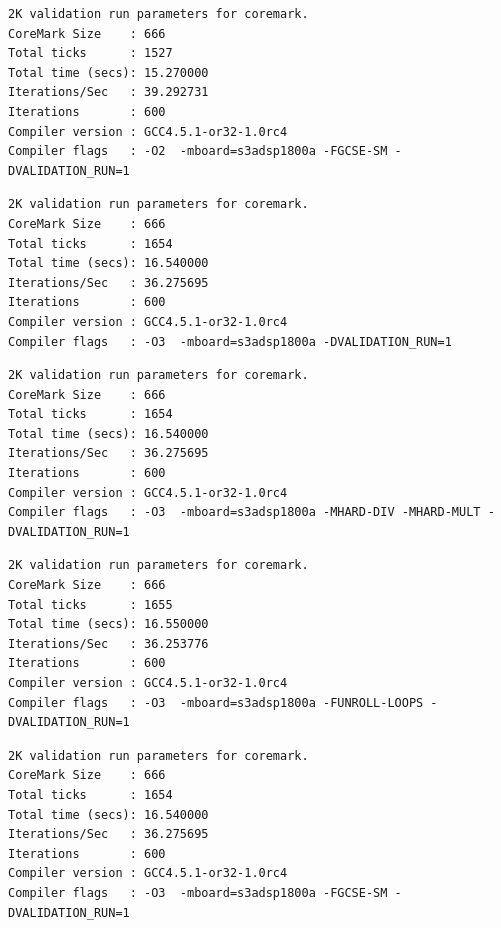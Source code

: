 \begin{lstlisting}[frame=single,caption={Optimización nivel -O2 - Flags activos : -FGCSE-SM},label={lst:salidas},breaklines]
2K validation run parameters for coremark.
CoreMark Size    : 666
Total ticks      : 1527
Total time (secs): 15.270000
Iterations/Sec   : 39.292731
Iterations       : 600
Compiler version : GCC4.5.1-or32-1.0rc4
Compiler flags   : -O2  -mboard=s3adsp1800a -FGCSE-SM -DVALIDATION_RUN=1  
\end{lstlisting}

\begin{lstlisting}[frame=single,caption={Optimización nivel -O3 - Sin Flags activos},label={lst:salidas},breaklines]
2K validation run parameters for coremark.
CoreMark Size    : 666
Total ticks      : 1654
Total time (secs): 16.540000
Iterations/Sec   : 36.275695
Iterations       : 600
Compiler version : GCC4.5.1-or32-1.0rc4
Compiler flags   : -O3  -mboard=s3adsp1800a -DVALIDATION_RUN=1  
\end{lstlisting}

\begin{lstlisting}[frame=single,caption={Optimización nivel -O3 - Flags activos -MHARD-DIV -MHARD-MULT},label={lst:salidas},breaklines]
2K validation run parameters for coremark.
CoreMark Size    : 666
Total ticks      : 1654
Total time (secs): 16.540000
Iterations/Sec   : 36.275695
Iterations       : 600
Compiler version : GCC4.5.1-or32-1.0rc4
Compiler flags   : -O3  -mboard=s3adsp1800a -MHARD-DIV -MHARD-MULT -DVALIDATION_RUN=1  
\end{lstlisting}

\begin{lstlisting}[frame=single,caption={Optimización nivel -O3 - Flags activos -FUNROLL-LOOPS},label={lst:salidas},breaklines]
2K validation run parameters for coremark.
CoreMark Size    : 666
Total ticks      : 1655
Total time (secs): 16.550000
Iterations/Sec   : 36.253776
Iterations       : 600
Compiler version : GCC4.5.1-or32-1.0rc4
Compiler flags   : -O3  -mboard=s3adsp1800a -FUNROLL-LOOPS -DVALIDATION_RUN=1  
\end{lstlisting}

\begin{lstlisting}[frame=single,caption={Optimización nivel -O3 - Flags activos -FGCSE-SM},label={lst:salidas},breaklines]
2K validation run parameters for coremark.
CoreMark Size    : 666
Total ticks      : 1654
Total time (secs): 16.540000
Iterations/Sec   : 36.275695
Iterations       : 600
Compiler version : GCC4.5.1-or32-1.0rc4
Compiler flags   : -O3  -mboard=s3adsp1800a -FGCSE-SM -DVALIDATION_RUN=1  
\end{lstlisting}

